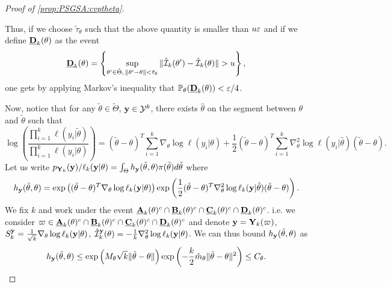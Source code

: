 \begin{proof}[Proof of \cref{prop:PSGSA:cvptheta}]
\begin{enumerate}
    
    Thus, {if we choose $\tilde\tau_\theta$ such that the above quantity is smaller than %
    $u\varepsilon$ and if we define $\underline{\mathbf{D}}_k(\theta)$ as the event}
    \begin{equation}
        \underline{\mbf D}_k(\theta)=\left\{\sup_{\theta'\in\tilde\Theta,\,\|\theta'-\theta\|<\tilde\tau_\theta}\|\hat\cI_k(\theta')-\hat\cI_k(\theta)\|>u \right\}, %
    \end{equation}
    one gets by applying Markov's inequality that $\mathbb{P}_\theta(\underline{\mathbf{D}}_k(\theta))<\varepsilon/4$.
    \end{enumerate}

    Now, notice that for any $\tilde\theta\in\tilde\Theta$, $\mathbf{y}\in\mathcal{Y}^k$, there exists $\hat\theta$ on the segment between $\theta$ and $\tilde\theta$ such that
    \begin{equation}\label{eq:DLlogfraclik}
        \log\left(\frac{\prod_{i=1}^k \ell(y_i|\tilde\theta)}{\prod_{i=1}^k \ell(y_i|\theta)}\right) = (\tilde\theta-\theta)^T\sum_{i=1}^k\nabla_\theta\log \ell(y_i|\theta) +\frac{1}{2}(\tilde\theta-\theta)^T\sum_{i=1}^k\nabla_\theta^2\log \ell(y_i|\hat\theta)(\tilde\theta-\theta).
    \end{equation}
    Let us write %
    $p_{\mathbf{Y}_k}(\mathbf{y})/\ell_k(\mathbf{y}|\theta) = \int_\Theta h_{\mathbf{y}}(\tilde\theta,\theta)\pi(\tilde\theta)d\tilde\theta$ where
    \begin{equation}\label{eq:hydef}
        h_{\mathbf{y}}(\tilde\theta,\theta) = \exp\left((\tilde\theta-\theta)^T\nabla_\theta\log\ell_k(\mathbf{y}|\theta)\right)  \exp \left( \frac{1}{2}(\tilde\theta-\theta)^T\nabla^2_\theta\log\ell_k(\mathbf{y}|\hat\theta)(\tilde\theta-\theta) \right).
    \end{equation}
    We fix $k$ and work under the event $\underline{\mathbf{A}}_k(\theta)^c\cap \underline{\mathbf{B}}_k(\theta)^c\cap \underline{\mathbf{C}}_k(\theta)^c\cap \underline{\mathbf{D}}_k(\theta)^c$. i.e. we %
    consider $\varpi\in \underline{\mathbf{A}}_k(\theta)^c\cap \underline{\mathbf{B}}_k(\theta)^c\cap \underline{\mathbf{C}}_k(\theta)^c\cap \underline{\mathbf{D}}_k(\theta)^c$ and denote $\mathbf{y} = \mathbf{Y}_k(\varpi)$, $ S_k^{\mathbf{y}}=\frac{1}{\sqrt{k}}\nabla_\theta\log\ell_k(\mathbf{y}|\theta)$, $\hat{\mathcal{I}}_k^{\mathbf{y}}(\theta) =-\frac{1}{k}\nabla^2_\theta\log\ell_k(\mathbf{y}|\theta) $.
    We can thus bound $h_{\mathbf{y}}(\tilde\theta,\theta)$  as
    \begin{equation}\label{eq:inegh}
        h_{\mathbf{y}}(\tilde\theta,\theta) \leq\exp\left( M_\theta\sqrt{k}\|\tilde\theta-\theta\| \right)\exp\left( -\frac{k}{2}\hat m_\theta\|\tilde\theta-\theta\|^2 \right)\leq C_\theta.
    \end{equation}
    

\end{proof}
